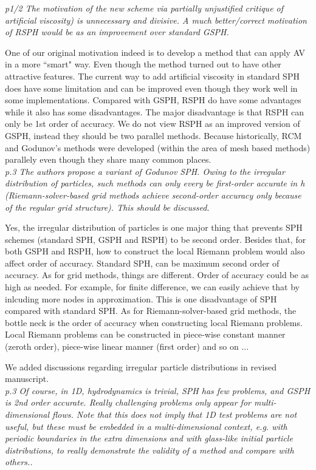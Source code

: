 \documentclass[10pt,a4paper]{article}
\begin{document}
\textit{p1/2 The motivation of the new scheme via partially unjustified critique of artificial viscosity) is unnecessary and divisive. A much
better/correct motivation of RSPH would be as an improvement over standard GSPH.}

One of our original motivation indeed is to develop a method that can apply AV in a more ``smart" way. Even though the method turned out to have other attractive features.
The current way to add artificial viscosity in standard SPH does have some limitation and can be improved even though they work well in some implementations.
Compared with GSPH, RSPH do have some advantages while it also has some disadvantages. The major disadvantage is that RSPH can only be 1st order of accuracy.
We do not view RSPH as an improved version of GSPH, instead they should be two parallel methods. Because historically, RCM and Godunov's methods were developed (within the area of mesh based methods) parallely even though they share many common places.
\\[3pt]

\textit{p.3 The authors propose a variant of Godunov SPH. Owing to the irregular distribution of particles, such methods can only every be first-order accurate in h (Riemann-solver-based grid methods achieve second-order accuracy only because of the regular grid structure). This should be discussed.}

Yes, the irregular distribution of particles is one  major thing that prevents SPH schemes (standard SPH, GSPH and RSPH) to be second order. Besides that, for both GSPH and RSPH, how to construct the local Riemann problem would also affect order of accuracy. 
Standard SPH, can be maximum second order of accuracy. As for grid methods, things are different. Order of accuracy could be as high as needed. For example, for finite difference, we can easily achieve that by inlcuding more nodes in approximation. This is one disadvantage of SPH compared with standard SPH. As for Riemann-solver-based grid methods, the bottle neck is the order of accuracy when constructing local Riemann problems. Local Riemann problems can be constructed in piece-wise constant manner (zeroth order), piece-wise linear manner (first order) and so on ...

We added discussions regarding irregular particle distributions in revised manuscript.
\\[3pt]

\textit{p.3 Of course, in 1D, hydrodynamics is trivial, SPH has few problems, and
GSPH is 2nd order accurate. Really challenging problems only appear for multi-dimensional flows. Note that this does not imply that 1D test
problems are not useful, but these must be embedded in a multi-dimensional context, e.g. with periodic boundaries in the extra dimensions and with glass-like initial particle distributions, to really
demonstrate the validity of a method and compare with others..}
\end{document}
